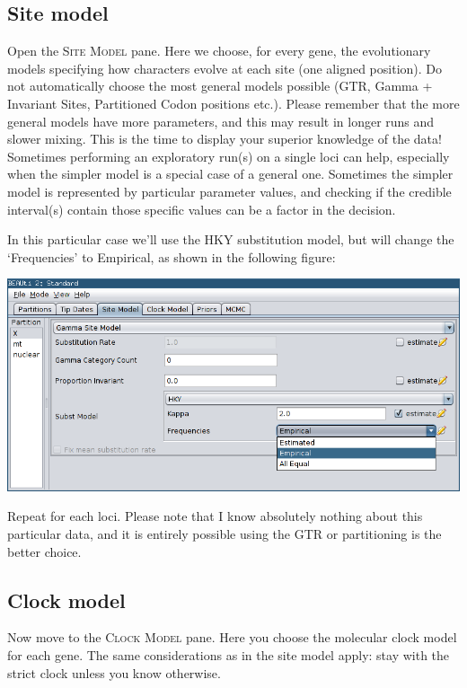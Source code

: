 \documentclass[a4paper,11pt]{article}
\begin{document}
\subsection{Site model}

Open the \textsc{Site Model} pane. Here we choose, for every gene, the
evolutionary models specifying how characters evolve at each site (one aligned
position). Do not automatically choose the most general models possible (GTR,
Gamma + Invariant Sites, Partitioned Codon positions etc.). Please remember
that the more general models have more parameters, and this may result in
longer runs and slower mixing. This is the time to display your superior
knowledge of the data! Sometimes performing an exploratory run(s) on a single
loci can help, especially when the simpler model is a special case of a general
one. Sometimes the simpler model is represented by particular parameter values,
and checking if the credible interval(s) contain those specific values can be a
factor in the decision.

In this particular case we'll use the HKY substitution model, but will change
the `Frequencies' to Empirical, as shown in the following figure:

    \includegraphics[width=\textwidth]{figures/site_model.png}

Repeat for each loci. Please note that I know absolutely nothing about
this particular data, and it is entirely possible using the GTR or partitioning
is the better choice.

\subsection{Clock model}

Now move to the \textsc{Clock Model} pane. Here you choose the molecular clock
model for each gene. The same considerations as in the site model apply: stay
with the strict clock unless you know otherwise.
\end{document}
